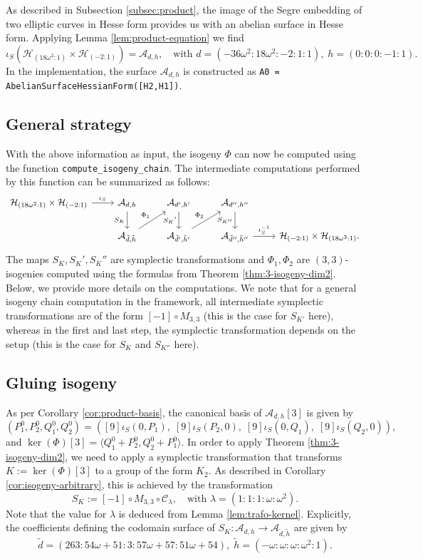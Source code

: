 \documentclass[11pt]{amsart}
\theoremstyle{definition}
\newcommand{\C}{\mathcal{C}}
\newcommand{\A}{\mathcal{A}}
\renewcommand{\H}{\mathcal{H}}
\newcommand{\HH}{\mathcal{H}}
\let \H\HH
\begin{document}
As described in Subsection \ref{subsec:product}, the image of the Segre embedding of two elliptic curves in Hesse form provides us with an abelian surface in Hesse form. Applying Lemma \ref{lem:product-equation} we find
\[
\iota_S\left(\H_{(18\omega^2:1)} \times \H_{(-2:1)} \right) = \A_{d,h},\quad \text{with } d = (-36\omega^2: 18\omega^2: -2: 1: 1), \; h =  (0: 0: 0: -1: 1).
\]
In the implementation, the surface $\A_{d,h}$ is constructed as \texttt{A0 = AbelianSurfaceHessianForm([H2,H1])}.

\subsection{General strategy}
With the above information as input, the isogeny $\Phi$ can now be computed using the function \texttt{compute\_isogeny\_chain}. The intermediate computations performed by this function can be summarized as follows:
\[
\begin{tikzcd}
    \H_{(18\omega^2:1)} \times \H_{(-2:1)} \arrow[r,"\iota_S"] &\A_{d,h} \arrow[d, swap, "S_K"] & \A_{d',h'} \arrow[d,swap, "S_K{'}"]& \A_{d'',h''} \arrow[d, swap, "S_{K''}"]&\\
    & \A_{\tilde d, \tilde h} \arrow[ur, "\Phi_1"] &  \A_{\tilde d', \tilde h'} \arrow[ur, "\Phi_2"] &  \A_{\tilde d'', \tilde h''} \arrow[r, "\iota_S^{-1}"]&  \H_{(-2:1)} \times \H_{(18\omega^2:1)}.
\end{tikzcd}
\]
The maps $S_K,S_K',S_K''$ are symplectic transformations and $\Phi_1, \Phi_2$ are $(3,3)$-isogenies computed using the formulas from Theorem \ref{thm:3-isogeny-dim2}. Below, we provide more details on the computations. We note that for a general isogeny chain computation in the framework, all intermediate symplectic transformations are of the form $[-1] \circ M_{3,3}$ (this is the case for $S_{K'}$ here), whereas in the first and last step, the symplectic transformation depends on the setup (this is the case for $S_K$ and $S_{K''}$ here).

\subsection{Gluing isogeny}
As per Corollary \ref{cor:product-basis}, the canonical basis of $\A_{d,h}[3]$ is given by 
\[
\left(P_1^0,P_2^0, Q_1^0,Q_2^0\right) = \left([9] \iota_S(0, P_1),\; [9] \iota_S(P_2,0), \; [9] \iota_S(0,Q_1), \; [9] \iota_S(Q_2,0) \right),
\]
and $\ker(\Phi)[3] = \langle Q_1^0 + P_2^0, Q_2^0+P_1^0\rangle$. In order to apply Theorem \ref{thm:3-isogeny-dim2}, we need to apply a symplectic transformation that transforms $K:=\ker(\Phi)[3]$ to a group of the form $K_2$. As described in Corollary \ref{cor:isogeny-arbitrary}, this is achieved by the transformation \[
S_K := [-1] \circ M_{3,3} \circ \C_\lambda,\quad \text{with } \lambda = (1:1:1:\omega:\omega^2).
\] Note that the value for $\lambda$ is deduced from Lemma \ref{lem:trafo-kernel}. Explicitly, the coefficients defining the codomain surface of $S_K: \A_{d,h} \to \A_{\tilde{d},\tilde{h}}$ are given by
\[
 \tilde d = (263: 54\omega + 51 : 3 : 57\omega + 57 : 51\omega + 54),\; \tilde h =  (-\omega: \omega: \omega: \omega^2: 1).
\]
\end{document}

